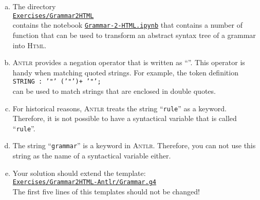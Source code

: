 \remarkEng
\begin{enumerate}[(a)]
\item The directory 
      \\[0.2cm]
      \hspace*{1.3cm}
      \href{https://github.com/karlstroetmann/Formal-Languages/tree/master/Exercises/Grammar2HTML-Antlr/}{\texttt{Exercises/Grammar2HTML}}
      \\[0.2cm]
      contains the notebook      
      \href{https://github.com/karlstroetmann/Formal-Languages/blob/master/Exercises/Grammar2HTML-Antlr/Grammar-2-HTML.ipynb}{\texttt{Grammar-2-HTML.ipynb}}
      that contains a number of function that can be used to transform an abstract syntax tree of a grammar
      into \textsc{Html}.
\item \textsc{Antlr} provides a negation operator that is written as ``\texttt{}''.
      This operator is handy when matching quoted strings.  For example, the token definition
      \\[0.2cm]
      \hspace*{1.3cm}
      \texttt{STRING : '"' ('"')+ '"';}
      \\[0.2cm]
      can be used to match strings that are enclosed in double quotes.
\item For historical reasons, \textsc{Antlr} treats the string ``\texttt{rule}'' as a 
      keyword.  Therefore, it is not possible to have a syntactical variable that is called
      ``\texttt{rule}''. 
\item The string ``\texttt{grammar}'' is a keyword in \textsc{Antlr}.  Therefore, you can not use this string
      as the name of a syntactical variable either.
\item Your solution should extend the template:
      \\[0.2cm]
      \hspace*{1.3cm}
      \href{https://github.com/karlstroetmann/Formal-Languages/tree/master/Exercises/Grammar2HTML-Antlr/Grammar.g4}{
      \texttt{Exercises/Grammar2HTML-Antlr/Grammar.g4}}
      \\[0.2cm]
      The first five lines of this templates should not be changed!
\end{enumerate}

